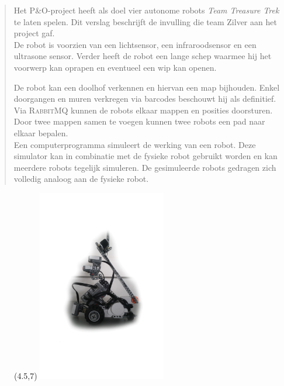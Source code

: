 \documentclass[eind]{penoverslag}
\begin{document}

\maketitlepage

\newpage

\begin{abstract}
\label{ssec:Abstract}
Het P\&O-project heeft als doel vier autonome robots \textit{Team Treasure Trek} te laten spelen. Dit verslag beschrijft de invulling die team Zilver aan het project gaf.\\

De robot is voorzien van een lichtsensor, een infraroodsensor en een ultrasone sensor. Verder heeft de robot een lange schep waarmee hij het voorwerp kan oprapen en eventueel een wip kan openen.

De robot kan een doolhof verkennen en hiervan een map bijhouden. Enkel doorgangen en muren verkregen via barcodes beschouwt hij als definitief. Via \textsc{RabbitMQ} kunnen de robots elkaar mappen en posities doorsturen. Door twee mappen samen te voegen kunnen twee robots een pad naar elkaar bepalen.\\

Een computerprogramma simuleert de werking van een robot. Deze simulator kan in combinatie met de fysieke robot gebruikt worden en kan meerdere robots tegelijk simuleren. De gesimuleerde robots gedragen zich volledig analoog aan de fysieke robot.
\end{abstract}

\begin{figure}[!hb]
\begin{textblock}{38}(4.5,7)
    \includegraphics[width=0.50\textwidth]{robotVoor}
    \label{fig:robotFP}
\end{textblock}
\end{figure}
\end{document}
